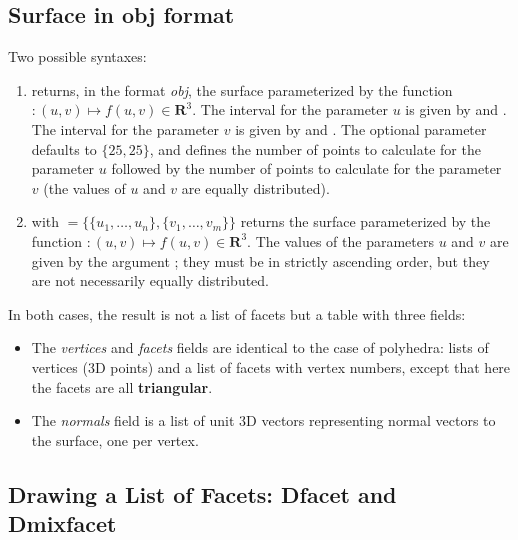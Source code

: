 \subsection{Surface in obj format}

Two possible syntaxes:
\begin{enumerate}
    \item {} returns, in the format \emph{obj}, the surface parameterized by the function $\colon(u,v) \mapsto f(u,v)\in \mathbf R^3$. The interval for the parameter $u$ is given by  and . The interval for the parameter $v$ is given by  and . The optional parameter  defaults to $\{25,25\}$, and defines the number of points to calculate for the parameter $u$ followed by the number of points to calculate for the parameter $v$ (the values ​​of $u$ and $v$ are equally distributed).

    \item {} with $=\{\{u_1,\ldots,u_n\}, \{v_1,\ldots,v_m\}\}$ returns the surface parameterized by the function $\colon(u,v) \mapsto f(u,v)\in \mathbf R^3$. The values ​​of the parameters $u$ and $v$ are given by the argument ; they must be in strictly ascending order, but they are not necessarily equally distributed.
\end{enumerate}

In both cases, the result is not a list of facets but a table with three fields:
\begin{itemize}
    \item The \emph{vertices} and \emph{facets} fields are identical to the case of polyhedra: lists of vertices (3D points) and a list of facets with vertex numbers, except that here the facets are all \textbf{triangular}.

    \item The \emph{normals} field is a list of unit 3D vectors representing normal vectors to the surface, one per vertex.
\end{itemize}


\subsection{Drawing a List of Facets: Dfacet and Dmixfacet}

